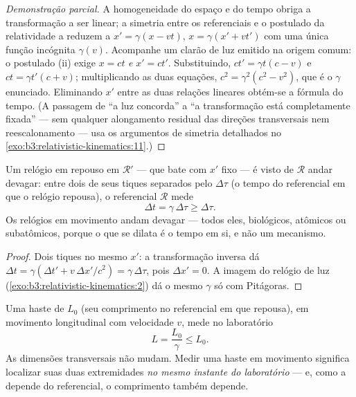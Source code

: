 \begin{proof}[Demonstração parcial]
A homogeneidade do espaço e do tempo obriga a transformação a ser
linear; a simetria entre os referenciais e o postulado da relatividade
a reduzem a $x' = \gamma(x - vt)$, $x = \gamma(x' + vt')$ com uma única
função incógnita $\gamma(v)$. Acompanhe um clarão de luz emitido na
origem comum: o postulado (ii) exige $x = ct$ \emph{e} $x' = ct'$.
Substituindo, $ct' = \gamma t(c - v)$ e $ct = \gamma t'(c + v)$;
multiplicando as duas equações, $c^2 = \gamma^2(c^2 - v^2)$, que é o
$\gamma$ enunciado. Eliminando $x'$ entre as duas relações lineares
obtém-se a fórmula do tempo. (A passagem de ``a luz concorda'' a ``a
transformação está completamente fixada'' --- sem qualquer alongamento
residual das direções transversais nem reescalonamento --- usa os
argumentos de simetria detalhados no
\cref{exo:b3:relativistic-kinematics:11}.)
\end{proof}

\begin{proposition}\label{prop:b3:relativistic-kinematics:dilation}
Um relógio em repouso em $\mathcal R'$ --- que bate com $x'$ fixo --- é
visto de $\mathcal R$ andar devagar: entre dois de seus tiques
separados pelo \emph{} $\Delta\tau$ (o tempo do
referencial em que o relógio repousa), o referencial $\mathcal R$ mede
\[
\Delta t = \gamma\,\Delta\tau \ge \Delta\tau .
\]
Os relógios em movimento andam devagar --- todos eles, biológicos,
atômicos ou subatômicos, porque o que se dilata é o tempo em si, e não
um mecanismo.
\end{proposition}

\begin{proof}
Dois tiques no mesmo $x'$: a transformação inversa dá $\Delta t
= \gamma(\Delta t' + v\,\Delta x'/c^2) = \gamma\,\Delta\tau$, pois
$\Delta x' = 0$. A imagem do relógio de luz
(\cref{exo:b3:relativistic-kinematics:2}) dá o mesmo $\gamma$ só com
Pitágoras.
\end{proof}

\begin{proposition}\label{prop:b3:relativistic-kinematics:contraction}
Uma haste de \emph{} $L_0$ (seu comprimento no
referencial em que repousa), em movimento longitudinal com velocidade
$v$, mede no laboratório
\[
L = \frac{L_0}{\gamma} \le L_0 .
\]
As dimensões transversais não mudam. Medir uma haste em movimento
significa localizar suas duas extremidades \emph{no mesmo instante do
laboratório} --- e, como a  depende do referencial, o
comprimento também depende.
\end{proposition}

